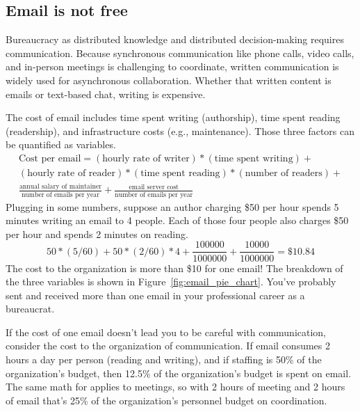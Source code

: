 
\subsection*{Email is not free}

Bureaucracy as distributed knowledge and distributed decision-making requires communication. Because synchronous communication like phone calls, video calls, and in-person meetings is challenging to coordinate, written communication is widely used for asynchronous collaboration. Whether that written content is emails or text-based chat, writing is expensive.

The cost of email includes time spent writing (authorship), time spent reading (readership), and infrastructure costs (e.g., maintenance). Those three factors can be quantified as variables. 
%
\begin{multline*}
\text{Cost per email} = 
(\text{hourly rate of writer})*(\text{time spent writing}) +\\
(\text{hourly rate of reader})*(\text{time spent reading})*(\text{number of readers})+\\
\frac{\text{annual salary of maintainer}}{\text{number of emails per year}} + \frac{\text{email server cost}}{\text{number of emails per year}}
\end{multline*}
Plugging in some numbers, suppose an author charging \$50 per hour spends 5 minutes writing an email to 4 people. Each of those four people also charges \$50 per hour and spends 2 minutes on reading. 
\begin{equation*}
50*(5/60) + 50*(2/60)*4 + \frac{100000}{1000000} + \frac{10000}{1000000} = \$10.84
\label{eq:four_readers}
\end{equation*}
The cost to the organization is more than \$10 for one email! The breakdown of the three variables is shown in Figure~\ref{fig:email_pie_chart}. You've probably sent and received more than one email in your professional career as a bureaucrat. 


If the cost of one email doesn't lead you to be careful with communication, consider the cost to the organization of communication. If email consumes 2 hours a day per person (reading and writing), and if staffing is 50\% of the organization's budget, then 
12.5\% of the organization's budget is spent on email. The same math for applies to meetings, so with 2 hours of meeting and 2 hours of email that's 25\% of the organization's personnel budget on coordination.

